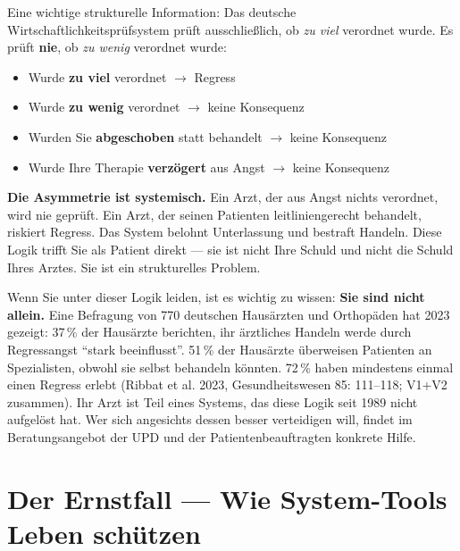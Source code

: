 \documentclass[a4paper]{umbruch-position}
\begin{document}
Eine wichtige strukturelle Information: Das deutsche Wirtschaftlichkeitspr\"ufsystem pr\"uft ausschlie\ss{}lich, ob \textit{zu viel} verordnet wurde. Es pr\"uft \textbf{nie}, ob \textit{zu wenig} verordnet wurde:

\begin{itemize}
    \item Wurde \textbf{zu viel} verordnet $\to$ Regress
    \item Wurde \textbf{zu wenig} verordnet $\to$ keine Konsequenz
    \item Wurden Sie \textbf{abgeschoben} statt behandelt $\to$ keine Konsequenz
    \item Wurde Ihre Therapie \textbf{verz\"ogert} aus Angst $\to$ keine Konsequenz
\end{itemize}

\textbf{Die Asymmetrie ist systemisch.} Ein Arzt, der aus Angst nichts verordnet, wird nie gepr\"uft. Ein Arzt, der seinen Patienten leitliniengerecht behandelt, riskiert Regress. Das System belohnt Unterlassung und bestraft Handeln. Diese Logik trifft Sie als Patient direkt --- sie ist nicht Ihre Schuld und nicht die Schuld Ihres Arztes. Sie ist ein strukturelles Problem.

Wenn Sie unter dieser Logik leiden, ist es wichtig zu wissen: \textbf{Sie sind nicht allein.} Eine Befragung von 770 deutschen Haus\"arzten und Orthop\"aden hat 2023 gezeigt: 37\,\% der Haus\"arzte berichten, ihr \"arztliches Handeln werde durch Regressangst ``stark beeinflusst''. 51\,\% der Haus\"arzte \"uberweisen Patienten an Spezialisten, obwohl sie selbst behandeln k\"onnten. 72\,\% haben mindestens einmal einen Regress erlebt (Ribbat et al. 2023, Gesundheitswesen 85: 111--118; V1+V2 zusammen). Ihr Arzt ist Teil eines Systems, das diese Logik seit 1989 nicht aufgel\"ost hat. Wer sich angesichts dessen besser verteidigen will, findet im Beratungsangebot der UPD und der Patientenbeauftragten konkrete Hilfe.

\section{Der Ernstfall --- Wie System-Tools Leben sch\"utzen}
\end{document}
